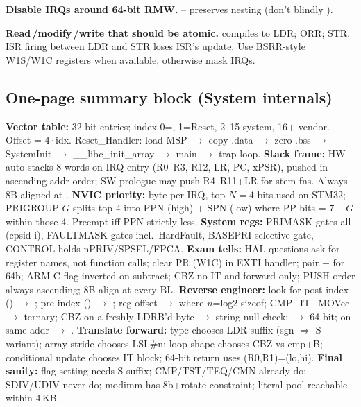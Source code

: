 \begin{ex}\textbf{Disable IRQs around 64-bit RMW.}  -- preserves nesting (don't blindly ).\end{ex}

\begin{ex}\textbf{Read\,/modify\,/write that should be atomic.}  compiles to LDR; ORR; STR. ISR firing between LDR and STR loses ISR's update. Use BSRR-style W1S/W1C registers when available, otherwise mask IRQs.\end{ex}

\subsection{One-page summary block (System internals)}
\textbf{Vector table:} 32-bit entries; index 0=, 1=Reset, 2--15 system, 16+ vendor. Offset = $4\cdot$idx. Reset\_Handler: load MSP $\to$ copy .data $\to$ zero .bss $\to$ SystemInit $\to$ \_\_libc\_init\_array $\to$ main $\to$ trap loop. \textbf{Stack frame:} HW auto-stacks 8 words on IRQ entry (R0--R3, R12, LR, PC, xPSR), pushed in ascending-addr order; SW prologue may push R4--R11+LR for stem fns. Always 8B-aligned at . \textbf{NVIC priority:} byte per IRQ, top $N=4$ bits used on STM32; PRIGROUP $G$ splits top 4 into PPN (high) + SPN (low) where PP bits = $7-G$ within those 4. Preempt iff PPN strictly less. \textbf{System regs:} PRIMASK gates all (cpsid i), FAULTMASK gates incl.\ HardFault, BASEPRI selective gate, CONTROL holds nPRIV/SPSEL/FPCA. \textbf{Exam tells:} HAL questions ask for register names, not function calls; clear PR (W1C) in EXTI handler; pair + for 64b; ARM C-flag inverted on subtract; CBZ no-IT and forward-only; PUSH order always ascending; 8B align at every BL. \textbf{Reverse engineer:} look for post-index () $\to$ ; pre-index (\asm{[Rb,\#k]!}) $\to$ ; reg-offset \asm{[Rb,Ri,LSL\#n]} $\to$  where $n$=log2 sizeof; CMP+IT+MOVcc $\to$ ternary; CBZ on a freshly LDRB'd byte $\to$ string null check;  $\to$ 64-bit;  on same addr $\to$ . \textbf{Translate forward:} type chooses LDR suffix (sgn $\Rightarrow$ S-variant); array stride chooses LSL\#n; loop shape chooses CBZ vs cmp+B; conditional update chooses IT block; 64-bit return uses (R0,R1)=(lo,hi). \textbf{Final sanity:} flag-setting needs S-suffix; CMP/TST/TEQ/CMN already do; SDIV/UDIV never do; modimm has 8b+rotate constraint; literal pool reachable within 4\,KB.

